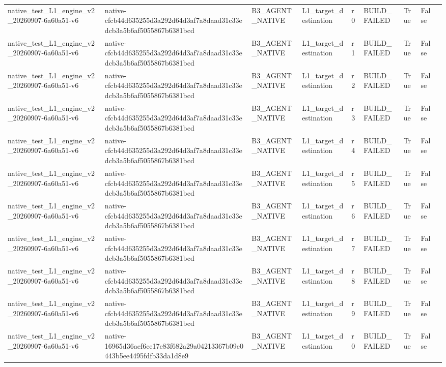 \begin{tabular}{lllllllll}
native\_test\_L1\_engine\_v2\_20260907-6a60a51-v6 & native-cfcb44d635255d3a292d64d3af7a8daad31c33edcb3a5b6af5055867b6381bcd & B3\_AGENT\_NATIVE & L1\_target\_destination & r0 & BUILD\_FAILED & True & False &  \\
native\_test\_L1\_engine\_v2\_20260907-6a60a51-v6 & native-cfcb44d635255d3a292d64d3af7a8daad31c33edcb3a5b6af5055867b6381bcd & B3\_AGENT\_NATIVE & L1\_target\_destination & r1 & BUILD\_FAILED & True & False &  \\
native\_test\_L1\_engine\_v2\_20260907-6a60a51-v6 & native-cfcb44d635255d3a292d64d3af7a8daad31c33edcb3a5b6af5055867b6381bcd & B3\_AGENT\_NATIVE & L1\_target\_destination & r2 & BUILD\_FAILED & True & False &  \\
native\_test\_L1\_engine\_v2\_20260907-6a60a51-v6 & native-cfcb44d635255d3a292d64d3af7a8daad31c33edcb3a5b6af5055867b6381bcd & B3\_AGENT\_NATIVE & L1\_target\_destination & r3 & BUILD\_FAILED & True & False &  \\
native\_test\_L1\_engine\_v2\_20260907-6a60a51-v6 & native-cfcb44d635255d3a292d64d3af7a8daad31c33edcb3a5b6af5055867b6381bcd & B3\_AGENT\_NATIVE & L1\_target\_destination & r4 & BUILD\_FAILED & True & False &  \\
native\_test\_L1\_engine\_v2\_20260907-6a60a51-v6 & native-cfcb44d635255d3a292d64d3af7a8daad31c33edcb3a5b6af5055867b6381bcd & B3\_AGENT\_NATIVE & L1\_target\_destination & r5 & BUILD\_FAILED & True & False &  \\
native\_test\_L1\_engine\_v2\_20260907-6a60a51-v6 & native-cfcb44d635255d3a292d64d3af7a8daad31c33edcb3a5b6af5055867b6381bcd & B3\_AGENT\_NATIVE & L1\_target\_destination & r6 & BUILD\_FAILED & True & False &  \\
native\_test\_L1\_engine\_v2\_20260907-6a60a51-v6 & native-cfcb44d635255d3a292d64d3af7a8daad31c33edcb3a5b6af5055867b6381bcd & B3\_AGENT\_NATIVE & L1\_target\_destination & r7 & BUILD\_FAILED & True & False &  \\
native\_test\_L1\_engine\_v2\_20260907-6a60a51-v6 & native-cfcb44d635255d3a292d64d3af7a8daad31c33edcb3a5b6af5055867b6381bcd & B3\_AGENT\_NATIVE & L1\_target\_destination & r8 & BUILD\_FAILED & True & False &  \\
native\_test\_L1\_engine\_v2\_20260907-6a60a51-v6 & native-cfcb44d635255d3a292d64d3af7a8daad31c33edcb3a5b6af5055867b6381bcd & B3\_AGENT\_NATIVE & L1\_target\_destination & r9 & BUILD\_FAILED & True & False &  \\
native\_test\_L1\_engine\_v2\_20260907-6a60a51-v6 & native-16965d36aef6ce17e83f682a29a04213367b09e0443b5ee4495fdfb33da1d8e9 & B3\_AGENT\_NATIVE & L1\_target\_destination & r0 & BUILD\_FAILED & True & False &  \\

\end{tabular}

